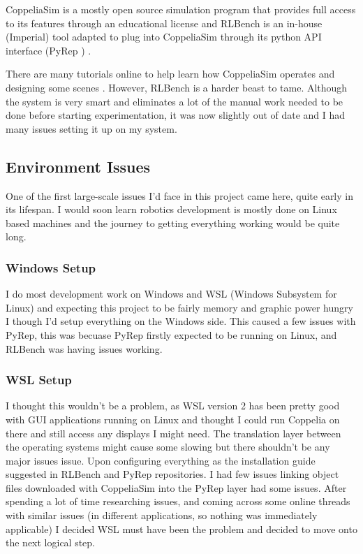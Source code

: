 CoppeliaSim is a mostly open source simulation program that provides full access to its features through an educational license and RLBench is an in-house (Imperial) tool adapted to plug into CoppeliaSim through its python API interface (PyRep \cite{}) . 

There are many tutorials online to help learn how CoppeliaSim operates and designing some scenes . However, RLBench is a harder beast to tame. Although the system is very smart and eliminates a lot of the manual work needed to be done before starting experimentation, it was now slightly out of date and I had many issues setting it up on my system.

\subsection{Environment Issues}
One of the first large-scale issues I'd face in this project came here, quite early in its lifespan. I would soon learn robotics development is mostly done on Linux based machines and the journey to getting everything working would be quite long.

\subsubsection{Windows Setup}
I do most development work on Windows and WSL (Windows Subsystem for Linux) \cite{} and expecting this project to be fairly memory and graphic power hungry I though I'd setup everything on the Windows side. This caused a few issues with PyRep, this was becuase PyRep firstly expected to be running on Linux, and RLBench was having issues working.

\subsubsection{WSL Setup}
I thought this wouldn't be a problem, as WSL version 2 has been pretty good with GUI applications running on Linux and thought I could run Coppelia on there and still access any displays I might need. The translation layer between the operating systems might cause some slowing but there shouldn't be any major issues issue. Upon configuring everything as the installation guide suggested in RLBench and PyRep repositories. I had few issues linking object files downloaded with CoppeliaSim into the PyRep layer had some issues. After spending a lot of time researching issues, and coming across some online threads with similar issues (in different applications, so nothing was immediately applicable) I decided WSL must have been the problem and decided to move onto the next logical step.
 
